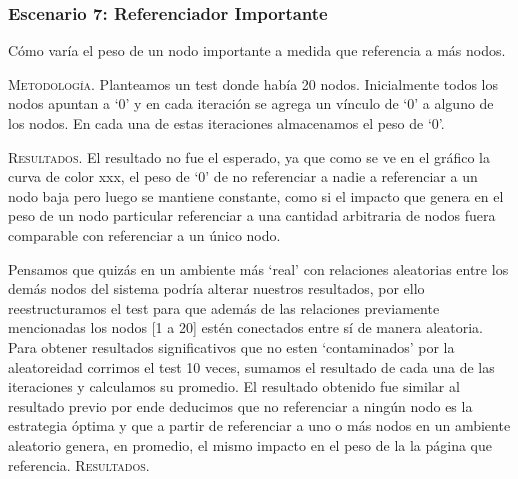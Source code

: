 \vspace{2em}
\subsubsection{Escenario 7: Referenciador Importante} Cómo varía el peso de un nodo importante a medida que referencia a más nodos. 

\vspace{1em}
\noindent \textsc{Metodología}. Planteamos un test donde había 20 nodos. Inicialmente todos los nodos apuntan a `0' y en cada iteración se agrega un vínculo de `0' a alguno de los nodos. 
En cada una de estas iteraciones almacenamos el peso de `0'.

\vspace{1em}
\noindent \textsc{Resultados}. El resultado no fue el esperado, ya que como se ve en el gráfico la curva de color xxx, el peso de `0' de no referenciar a nadie a referenciar a un nodo baja pero luego se mantiene constante, como si el impacto que genera en el peso de un nodo particular referenciar a una cantidad arbitraria de nodos fuera comparable con referenciar a un único nodo. 

Pensamos que quizás en un ambiente más `real' con relaciones aleatorias entre los demás nodos del sistema podría alterar nuestros resultados, por ello reestructuramos el test para que además de las relaciones previamente mencionadas los nodos [1 a 20] estén conectados entre sí de manera aleatoria. Para obtener resultados significativos que no esten `contaminados' por la aleatoreidad corrimos el test 10 veces, sumamos el resultado de cada una de las iteraciones y calculamos su promedio.
El resultado obtenido fue similar al resultado previo por ende deducimos que no referenciar a ningún nodo es la estrategia óptima y que a partir de referenciar a uno o más nodos en un ambiente aleatorio genera, en promedio, el mismo impacto en el peso de la la página que referencia.
\noindent \textsc{Resultados}.
